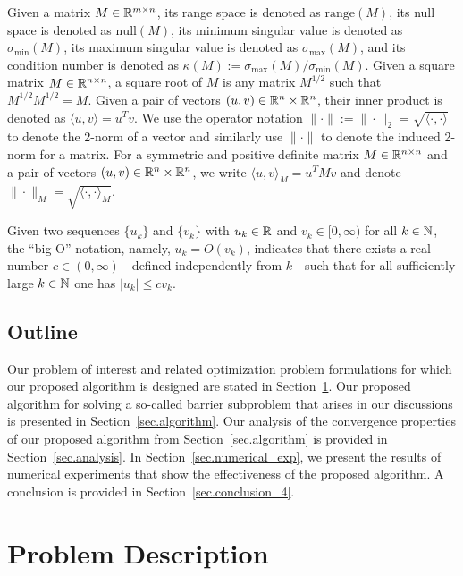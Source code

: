 Given a matrix $M \in \mathbb{R}^{m\times n}$, its range space is denoted as $\mathrm{range}(M)$, its null space is denoted as $\mathrm{null}(M)$, its minimum singular value is denoted as $\sigma_{\min}(M)$, its maximum singular value is denoted as $\sigma_{\max}(M)$, and its condition number is denoted as $\kappa(M) := \sigma_{\max}(M)/\sigma_{\min}(M)$.  Given a square matrix $M \in \mathbb{R}^{n \times n}$, a square root of $M$ is any matrix $M^{1/2}$ such that $M^{1/2}M^{1/2} = M$. Given a pair of vectors $(u,v) \in \mathbb{R}^n \times \mathbb{R}^n$, their inner product is denoted as $\langle u,v \rangle = u^Tv$.  We use the operator notation $\|\cdot\| := \|\cdot\|_2 = \sqrt{\langle \cdot, \cdot \rangle}$ to denote the 2-norm of a vector and similarly use $\|\cdot\|$ to denote the induced 2-norm for a matrix.  For a symmetric and positive definite matrix $M \in \mathbb{R}^{n \times n}$ and a pair of vectors $(u,v) \in \mathbb{R}^n \times \mathbb{R}^n$, we write $\langle u, v \rangle_M = u^T M v$ and denote $\|\cdot\|_M = \sqrt{\langle \cdot, \cdot \rangle_M}$.

Given two sequences $\{u_k\}$ and $\{v_k\}$ with $u_k \in \mathbb{R}$ and $v_k \in [0,\infty)$ for all $k \in \mathbb{N}$, the ``big-O'' notation, namely, $u_k = O(v_k)$, indicates that there exists a real number $c \in (0,\infty)$---defined independently from $k$---such that for all sufficiently large $k \in \mathbb{N}$ one has $|u_k| \leq c v_k$.

\subsection{Outline}

Our problem of interest and related optimization problem formulations for which our proposed algorithm is designed are stated in Section~\ref{sec.problem}.  Our proposed algorithm for solving a so-called barrier subproblem that arises in our discussions is presented in Section~\ref{sec.algorithm}.  Our analysis of the convergence properties of our proposed algorithm from Section~\ref{sec.algorithm} is provided in Section~\ref{sec.analysis}. In Section~\ref{sec.numerical_exp}, we present the results of numerical experiments that show the effectiveness of the proposed algorithm. A conclusion is provided in Section~\ref{sec.conclusion_4}.

\section{Problem Description}\label{sec.problem}

